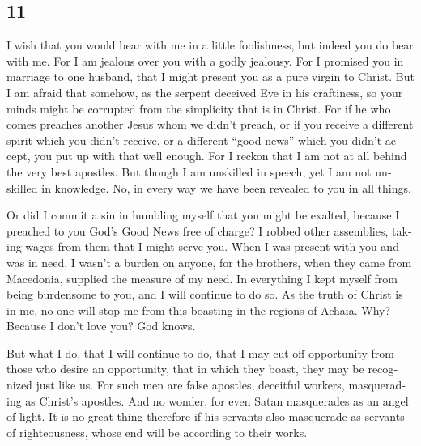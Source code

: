 \begin{paracol}{2}
\switchcolumn
\begin{otherlanguage}{english}

\hypertarget{section-21}{%
\section{11}\label{section-21}}

 I wish that you would bear with me in a little
foolishness, but indeed you do bear with me.  For I am
jealous over you with a godly jealousy. For I promised you in marriage
to one husband, that I might present you as a pure virgin to Christ.
 But I am afraid that somehow, as the serpent deceived Eve
in his craftiness, so your minds might be corrupted from the simplicity
that is in Christ.  For if he who comes preaches another
Jesus whom we didn't preach, or if you receive a different spirit which
you didn't receive, or a different ``good news'' which you didn't
accept, you put up with that well enough.  For I reckon
that I am not at all behind the very best apostles.  But
though I am unskilled in speech, yet I am not unskilled in knowledge.
No, in every way we have been revealed to you in all things.

 Or did I commit a sin in humbling myself that you might
be exalted, because I preached to you God's Good News free of charge?
 I robbed other assemblies, taking wages from them that I
might serve you.  When I was present with you and was in
need, I wasn't a burden on anyone, for the brothers, when they came from
Macedonia, supplied the measure of my need. In everything I kept myself
from being burdensome to you, and I will continue to do so.
 As the truth of Christ is in me, no one will stop me
from this boasting in the regions of Achaia.  Why?
Because I don't love you? God knows.

 But what I do, that I will continue to do, that I may
cut off opportunity from those who desire an opportunity, that in which
they boast, they may be recognized just like us.  For
such men are false apostles, deceitful workers, masquerading as Christ's
apostles.  And no wonder, for even Satan masquerades as
an angel of light.  It is no great thing therefore if his
servants also masquerade as servants of righteousness, whose end will be
according to their works.


\end{otherlanguage}
\end{paracol}
